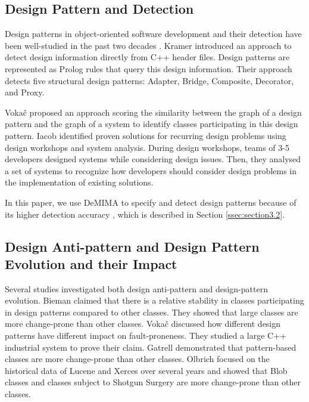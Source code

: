 \subsection{Design Pattern and Detection}

Design patterns in object-oriented software development and their detection have been well-studied in the past two decades \cite{gamma1995design,kramer1996design}. Kramer \etal \cite{kramer1996design} introduced an approach to detect design information directly from C++ header files. Design patterns are represented as Prolog rules that query this design information. Their approach detects five structural design patterns: Adapter, Bridge, Composite, Decorator, and Proxy. 

Voka\v{c} \etal \cite{vokavc2004defect} proposed an approach scoring the similarity between the graph of a design pattern and the graph of a system to identify classes participating in this design pattern. Iacob \etal \cite{iacob2011design} identified proven solutions for recurring design problems using design workshops and system analysis. During design workshops, teams of 3-5 developers designed systems while considering design issues. Then, they analysed a set of systems to recognize how developers should consider design problems in the implementation of existing solutions. 

In this paper, we use DeMIMA to specify and detect design patterns because of its higher detection accuracy \cite{gueheneuc2008demima}, which is described in Section \ref{ssec:section3.2}. 



\subsection{Design Anti-pattern and Design Pattern Evolution and their Impact}

Several studies investigated both design anti-pattern and design-pattern evolution. Bieman \etal \cite{bieman2003design} claimed that there is a relative stability in classes participating in design patterns compared to other classes. They showed that large classes are more change-prone than other classes. Voka\v{c} \etal \cite{vokavc2004defect} discussed how different design patterns have different impact on fault-proneness. They studied a large C++ industrial system to prove their claim. 
Gatrell \etal \cite{gatrell2009design} demonstrated that pattern-based classes are more change-prone than other classes. Olbrich \etal \cite{olbrich2009evolution} focused on the historical data of Lucene and Xerces over several years and showed that Blob classes and classes subject to Shotgun Surgery are more change-prone than other classes.

